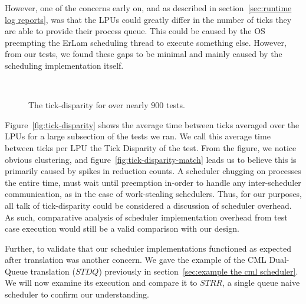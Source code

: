 However,
one of the concerns early on, and as described in section~\ref{sec:runtime log reports}, 
was that the LPUs could greatly differ in the number of ticks they are able to 
provide their process queue. This could be caused by the OS preempting the 
ErLam scheduling thread to execute something else. However, from our tests, we
found these gaps to be minimal and mainly caused by the scheduling implementation
itself. 

\begin{figure}[h!]
    ~
    \caption{The tick-disparity for over nearly $900$ tests.}
\end{figure}

Figure~\ref{fig:tick-disparity} shows the average time between ticks averaged over
the LPUs for a large subsection of the tests we ran. We call this average time 
between ticks per LPU the Tick Disparity of the test. From the figure, we notice
obvious clustering, and figure~\ref{fig:tick-disparity-match} leads us to believe this
is primarily caused by spikes in reduction counts. A scheduler chugging on 
processes the entire time, must wait until preemption in-order to handle any 
inter-scheduler communication, as in the case of work-stealing schedulers. Thus,
for our purposes, all talk of tick-disparity could be considered a discussion of
scheduler overhead. As such, comparative analysis of scheduler implementation 
overhead from test case execution would still be a valid comparison with our
design.

Further, to validate that our scheduler implementations functioned as expected 
after translation was another concern. We gave the example of the CML 
Dual-Queue translation ($STDQ$) previously in section~\ref{sec:example the cml scheduler}.
We will now examine its execution and compare it to $STRR$, a single queue naive
scheduler to confirm our understanding.

